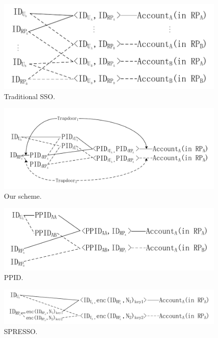 \begin{figure}
  \centering
  \includegraphics[width=\linewidth]{fig/link1.pdf}
  \caption{Traditional SSO.}
  \label{fig:TraditionalSSO}
\end{figure}
\begin{figure}
  \centering
  \includegraphics[width=\linewidth]{fig/link2.pdf}
  \caption{Our scheme.}
  \label{fig:Ourscheme}
\end{figure}
\begin{figure}
  \centering
  \includegraphics[width=\linewidth]{fig/link4.pdf}
  \caption{PPID.}
  \label{fig:PPID}
\end{figure}
\begin{figure}
  \centering
  \includegraphics[width=\linewidth]{fig/link3.pdf}
  \caption{SPRESSO.}
  \label{fig:SPRESSO}
\end{figure}


